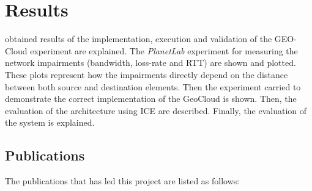 \chapter{Results}
\label{chap:results}

 obtained results of the implementation, execution and
validation of the GEO-Cloud experiment are explained. The \emph{PlanetLab}
experiment for measuring the network impairments (bandwidth, loss-rate and
\ac{RTT}) are shown and plotted. These plots represent how the impairments
directly depend on the distance between both source and destination elements.
Then the experiment carried to demonstrate the correct implementation of the
GeoCloud is shown. Then, the evaluation of the architecture using ICE are
described. Finally, the evaluation of the system is explained.





\section{Publications}

The publications that has led this project are listed as follows:

